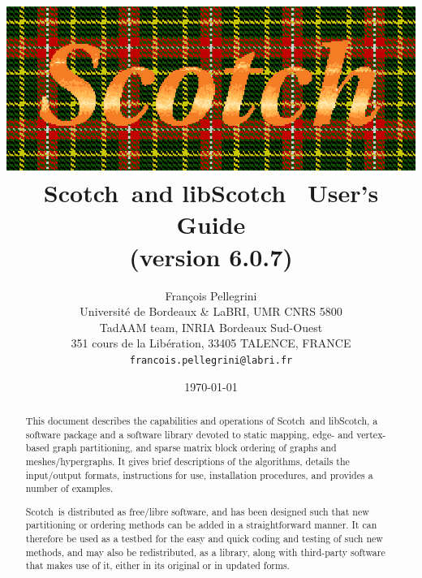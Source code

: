 \documentclass{article}
\newcommand{\scotch}{{\sc Scotch}}               %
\newcommand{\libscotch}{{\sc libScotch}}         %
\newcommand{\scotchver}{6.0}
\newcommand{\scotchversub}{6.0.7}
\begin{document}
\date{\today}

\title{\includegraphics{s_f_logo.ps}\\[1em]
       {\LARGE\bf \scotch\ and \libscotch\ {\sc \scotchver} User's Guide}\\[1em]%
       {\normalsize (version \scotchversub)}
}

\author{Fran\c cois Pellegrini\\
Universit\'e de Bordeaux \& LaBRI, UMR CNRS 5800\\
TadAAM team, INRIA Bordeaux Sud-Ouest\\
351 cours de la Lib\'eration, 33405 TALENCE, FRANCE\\
{\tt francois.pellegrini@labri.fr}}

\maketitle

\begin{abstract}
This document describes the capabilities and operations of
\scotch\ and \libscotch, a software package and a software library
devoted to static mapping, edge- and vertex-based graph partitioning,
and sparse matrix block ordering of graphs and meshes/hypergraphs. It
gives brief descriptions of the algorithms, details the input/output
formats, instructions for use, installation procedures, and provides a
number of examples.

\scotch\ is distributed as free/libre software, and has been
designed such that new partitioning or ordering methods can be added
in a straightforward manner. It can therefore be used as a testbed for
the easy and quick coding and testing of such new methods, and may
also be redistributed, as a library, along with third-party software
that makes use of it, either in its original or in updated forms.
\end{abstract}
\end{document}

